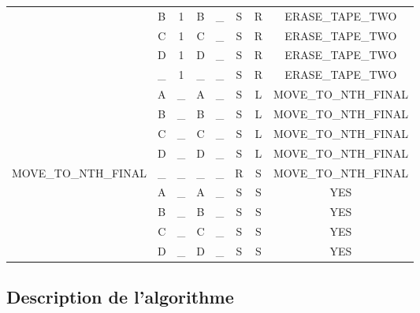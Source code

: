 \documentclass{report}
\begin{document}
\begin{adjustwidth}{-1.5cm}{0cm}
\begin{tabular}{| c | c c | c c | c c | c |}
       & B & 1 & B & \_ & S & R & ERASE\_TAPE\_TWO \\
       & C & 1 & C & \_ & S & R & ERASE\_TAPE\_TWO \\
       & D & 1 & D & \_ & S & R & ERASE\_TAPE\_TWO \\
       & \_ & 1 & \_ & \_ & S & R & ERASE\_TAPE\_TWO \\
       & A & \_ & A & \_ & S & L & MOVE\_TO\_NTH\_FINAL \\
       & B & \_ & B & \_ & S & L & MOVE\_TO\_NTH\_FINAL \\
       & C & \_ & C & \_ & S & L & MOVE\_TO\_NTH\_FINAL \\
       & D & \_ & D & \_ & S & L & MOVE\_TO\_NTH\_FINAL \\
  \hline
  MOVE\_TO\_NTH\_FINAL & \_ & \_ & \_ & \_ & R & S & MOVE\_TO\_NTH\_FINAL \\
       & A & \_ & A & \_ & S & S & YES \\
       & B & \_ & B & \_ & S & S & YES \\
       & C & \_ & C & \_ & S & S & YES \\
       & D & \_ & D & \_ & S & S & YES \\
  \hline
\end{tabular}
\end{adjustwidth}

\subsection{Description de l'algorithme}
\end{document}

